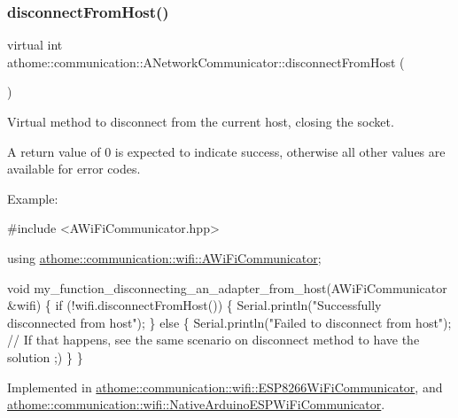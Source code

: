 \subsubsection{\texorpdfstring{disconnect\+From\+Host()}{disconnectFromHost()}}
{\footnotesize\ttfamily virtual int athome\+::communication\+::\+A\+Network\+Communicator\+::disconnect\+From\+Host (\begin{DoxyParamCaption}{ }\end{DoxyParamCaption})\hspace{0.3cm}{\ttfamily [pure virtual]}}

Virtual method to disconnect from the current host, closing the socket.

A return value of 0 is expected to indicate success, otherwise all other values are available for error codes.

Example\+:


\begin{DoxyCode}
\textcolor{preprocessor}{#include <AWiFiCommunicator.hpp>}

\textcolor{keyword}{using} \mbox{\hyperlink{classathome_1_1communication_1_1wifi_1_1_a_wi_fi_communicator}{athome::communication::wifi::AWiFiCommunicator}};

\textcolor{keywordtype}{void} my\_function\_disconnecting\_an\_adapter\_from\_host(AWiFiCommunicator &wifi) \{
  \textcolor{keywordflow}{if} (!wifi.disconnectFromHost()) \{
    Serial.println(\textcolor{stringliteral}{"Successfully disconnected from host"});
  \} \textcolor{keywordflow}{else} \{
    Serial.println(\textcolor{stringliteral}{"Failed to disconnect from host"}); \textcolor{comment}{// If that happens, see the same scenario on
       disconnect method to have the solution ;)}
  \}
\}
\end{DoxyCode}
 

Implemented in \mbox{\hyperlink{classathome_1_1communication_1_1wifi_1_1_e_s_p8266_wi_fi_communicator_a0f8adbe1b1d219148c4f340980056356}{athome\+::communication\+::wifi\+::\+E\+S\+P8266\+Wi\+Fi\+Communicator}}, and \mbox{\hyperlink{classathome_1_1communication_1_1wifi_1_1_native_arduino_e_s_p_wi_fi_communicator_a8fa44a5078cb7d61f01b306e1d0d1bfe}{athome\+::communication\+::wifi\+::\+Native\+Arduino\+E\+S\+P\+Wi\+Fi\+Communicator}}.

\mbox{\label{classathome_1_1communication_1_1_a_network_communicator_a5e3b278ad11e6c00ac7d3e2fee3f01b1}} 
